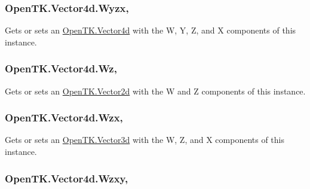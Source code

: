 \hypertarget{struct_open_t_k_1_1_vector4d_a2e7ba0af1a49014cb55aba88d227dcbf}{
\subsubsection[{Wyzx}]{ Open\-T\-K.\-Vector4d.\-Wyzx\hspace{0.3cm}{\ttfamily [get]}, {\ttfamily [set]}}}\label{struct_open_t_k_1_1_vector4d_a2e7ba0af1a49014cb55aba88d227dcbf}


Gets or sets an \hyperlink{struct_open_t_k_1_1_vector4d}{Open\-T\-K.\-Vector4d} with the W, Y, Z, and X components of this instance. 

\hypertarget{struct_open_t_k_1_1_vector4d_a9ba4c7347663f24f20fd565daaa36066}{
\subsubsection[{Wz}]{ Open\-T\-K.\-Vector4d.\-Wz\hspace{0.3cm}{\ttfamily [get]}, {\ttfamily [set]}}}\label{struct_open_t_k_1_1_vector4d_a9ba4c7347663f24f20fd565daaa36066}


Gets or sets an \hyperlink{struct_open_t_k_1_1_vector2d}{Open\-T\-K.\-Vector2d} with the W and Z components of this instance. 

\hypertarget{struct_open_t_k_1_1_vector4d_ab4176efafa4585535b7285b0f6e6ed90}{
\subsubsection[{Wzx}]{ Open\-T\-K.\-Vector4d.\-Wzx\hspace{0.3cm}{\ttfamily [get]}, {\ttfamily [set]}}}\label{struct_open_t_k_1_1_vector4d_ab4176efafa4585535b7285b0f6e6ed90}


Gets or sets an \hyperlink{struct_open_t_k_1_1_vector3d}{Open\-T\-K.\-Vector3d} with the W, Z, and X components of this instance. 

\hypertarget{struct_open_t_k_1_1_vector4d_aa7c1433815b91e99ded46d981cdb358b}{
\subsubsection[{Wzxy}]{ Open\-T\-K.\-Vector4d.\-Wzxy\hspace{0.3cm}{\ttfamily [get]}, {\ttfamily [set]}}}\label{struct_open_t_k_1_1_vector4d_aa7c1433815b91e99ded46d981cdb358b}



